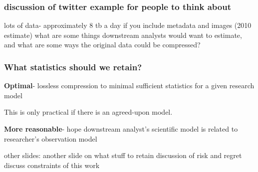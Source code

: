 \documentclass[10pt, compress]{beamer}
\begin{document}
\begin{frame}[fragile]
    \frametitle{discussion of twitter example for people to think about}

 lots of data- approximately 8 tb a day if you include metadata and images (2010 estimate)
 what are some things downstream analysts would want to estimate, and what are some ways the original data could be compressed?
\end{frame}

\begin{frame}[fragile]
    \frametitle{What statistics should we retain?}
    

    \textbf{Optimal}- lossless compression to minimal sufficient statistics for a given research model
    
    This is only practical if there is an agreed-upon model. 
    
    \textbf{More reasonable}- hope downstream analyst's scientific model is related to researcher's observation model 

\end{frame}

\begin{frame}[fragile]

    other slides:
    another slide on what stuff to retain
    discussion of risk and regret
    discuss constraints of this work


\end{frame}
\end{document}
